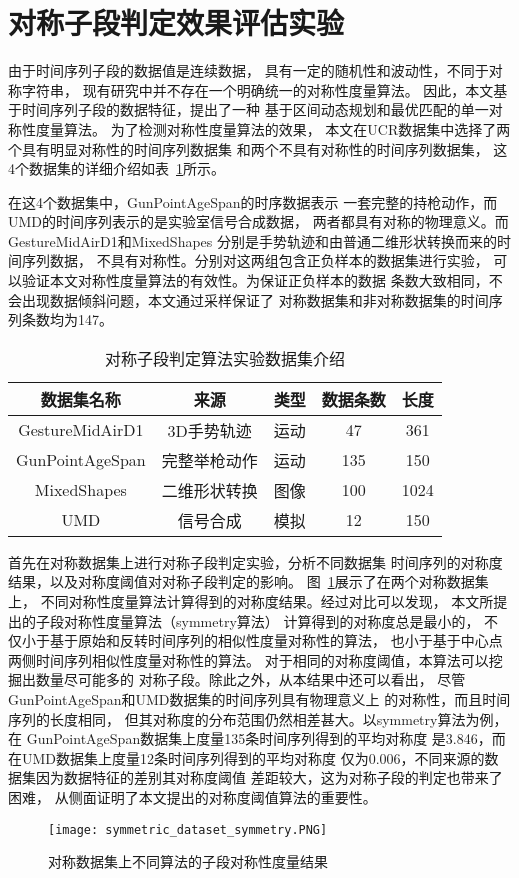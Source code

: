 \section{对称子段判定效果评估实验}

由于时间序列子段的数据值是连续数据，
具有一定的随机性和波动性，不同于对称字符串，
现有研究中并不存在一个明确统一的对称性度量算法。
因此，本文基于时间序列子段的数据特征，提出了一种
基于区间动态规划和最优匹配的单一对称性度量算法。
为了检测对称性度量算法的效果，
本文在UCR数据集中选择了两个具有明显对称性的时间序列数据集
和两个不具有对称性的时间序列数据集，
这4个数据集的详细介绍如表~\ref{tab:experiment_dataset}所示。

在这4个数据集中，GunPointAgeSpan的时序数据表示
一套完整的持枪动作，而UMD的时间序列表示的是实验室信号合成数据，
两者都具有对称的物理意义。而GestureMidAirD1和MixedShapes
分别是手势轨迹和由普通二维形状转换而来的时间序列数据，
不具有对称性。分别对这两组包含正负样本的数据集进行实验，
可以验证本文对称性度量算法的有效性。为保证正负样本的数据
条数大致相同，不会出现数据倾斜问题，本文通过采样保证了
对称数据集和非对称数据集的时间序列条数均为147。

\begin{table}
  \centering
  \caption{对称子段判定算法实验数据集介绍}
  \begin{tabular}{ccccc}
    \toprule
    数据集名称      & 来源         & 类型 & 数据条数 & 长度 \\
    \midrule
    GestureMidAirD1 & 3D手势轨迹   & 运动 & 47       & 361  \\
    GunPointAgeSpan & 完整举枪动作 & 运动 & 135      & 150  \\
    MixedShapes     & 二维形状转换 & 图像 & 100      & 1024 \\
    UMD             & 信号合成     & 模拟 & 12       & 150  \\
    \bottomrule
  \end{tabular}
  \label{tab:experiment_dataset}
\end{table}

首先在对称数据集上进行对称子段判定实验，分析不同数据集
时间序列的对称度结果，以及对称度阈值对对称子段判定的影响。
图~\ref{fig:symmetry_compare}展示了在两个对称数据集上，
不同对称性度量算法计算得到的对称度结果。经过对比可以发现，
本文所提出的子段对称性度量算法（symmetry算法）
计算得到的对称度总是最小的，
不仅小于基于原始和反转时间序列的相似性度量对称性的算法，
也小于基于中心点两侧时间序列相似性度量对称性的算法。
对于相同的对称度阈值，本算法可以挖掘出数量尽可能多的
对称子段。除此之外，从本结果中还可以看出，
尽管GunPointAgeSpan和UMD数据集的时间序列具有物理意义上
的对称性，而且时间序列的长度相同，
但其对称度的分布范围仍然相差甚大。以symmetry算法为例，在
GunPointAgeSpan数据集上度量135条时间序列得到的平均对称度
是3.846，而在UMD数据集上度量12条时间序列得到的平均对称度
仅为0.006，不同来源的数据集因为数据特征的差别其对称度阈值
差距较大，这为对称子段的判定也带来了困难，
从侧面证明了本文提出的对称度阈值算法的重要性。
\begin{figure}
  \centering
  \texttt{[image: symmetric\_dataset\_symmetry.PNG]}
  \caption{对称数据集上不同算法的子段对称性度量结果}
  \label{fig:symmetry_compare}
\end{figure}

